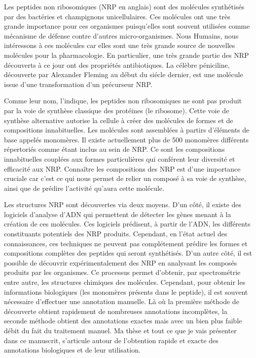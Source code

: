 Les peptides non ribosomiques (NRP en anglais) sont des molécules synthétisés par des bactéries et champignons unicellulaires.
Ces molécules ont une très grande importance pour ces organismes puisqu'elles sont souvent utilisées comme mécanisme de défense contre d'autres micro-organismes.
Nous Humains, nous intéressons à ces molécules car elles sont une très grande source de nouvelles molécules pour la pharmacologie.
En particulier, une très grande partie des NRP découverts à ce jour ont des propriétés antibiotiques.
La célèbre péniciline, découverte par Alexander Fleming au début du siécle dernier, est une molécule issue d'une transformation d'un précurseur NRP.

Comme leur nom, l'indique, les peptides non ribosomiques ne sont pas produit par la voie de synthèse classique des protéines (le ribosome).
Cette voie de synthèse alternative autorise la cellule à créer des molécules de formes et de compositions innabituelles.
Les molécules sont assemblées à partirs d'éléments de base appelés monomères.
Il existe actuellement plus de 500 monomères différents répertoriés comme étant inclus au sein de NRP.
Ce sont les compositions innabituelles couplées aux formes particulières qui conférent leur diversité et efficacité aux NRP.
Connaître les compositions des NRP est d'une importance cruciale car c'est ce qui nous permet de relier un composé à sa voie de synthèse, ainsi que de prédire l'activité qu'aura cette molécule.

Les structures NRP sont découvertes via deux moyens.
D'un côté, il existe des logiciels d'analyse d'ADN qui permettent de détecter les gènes menant à la création de ces molécules.
Ces logiciels prédisent, à partir de l'ADN, les différents constituants potentiels des NRP produits.
Cependant, en l'état actuel des connaissances, ces techniques ne peuvent pas complétement prédire les formes et compositions complètes des peptides qui seront synthétisés.
D'un autre côté, il est possible de découvrir expérimentalement des NRP en analysant les composés produits par les organismes.
Ce processus permet d'obtenir, par spectrométrie entre autre, les structures chimiques des molécules.
Cependant, pour obtenir les informations biologiques (les monomères présents dans le peptide), il est souvent nécessaire d'effectuer une annotation manuelle.
Là où la première méthode de découverte obtient rapidement de nombreuses annotations incomplètes, la seconde méthode obtient des annotations exactes mais avec un bien plus faible débit du fait du traitement manuel.
Ma thèse et tout ce que je vais présenter dans ce manuscrit, s'articule autour de l'obtention rapide et exacte des annotations biologiques et de leur utilisation.

